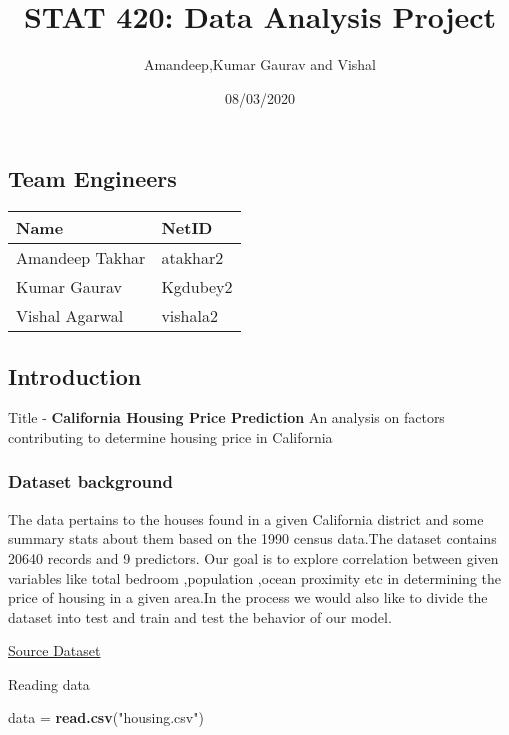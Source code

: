 \documentclass[
]{article}
\title{STAT 420: Data Analysis Project}
\author{Amandeep,Kumar Gaurav and Vishal}
\date{08/03/2020}
\newenvironment{Shaded}{\begin{snugshade}}{\end{snugshade}}
\newcommand{\KeywordTok}[1]{\textcolor[rgb]{0.13,0.29,0.53}{\textbf{#1}}}
\newcommand{\NormalTok}[1]{#1}
\newcommand{\StringTok}[1]{\textcolor[rgb]{0.31,0.60,0.02}{#1}}
\begin{document}
\maketitle

\hypertarget{team-engineers}{%
\subsection{Team Engineers}\label{team-engineers}}

\begin{longtable}[]{@{}ll@{}}
\toprule
Name & NetID\tabularnewline
\midrule
\endhead
Amandeep Takhar & atakhar2\tabularnewline
Kumar Gaurav & Kgdubey2\tabularnewline
Vishal Agarwal & vishala2\tabularnewline
\bottomrule
\end{longtable}

\hypertarget{introduction}{%
\subsection{Introduction}\label{introduction}}

Title - \textbf{California Housing Price Prediction} {An analysis on
factors contributing to determine housing price in California}

\hypertarget{dataset-background}{%
\subsubsection{Dataset background}\label{dataset-background}}

The data pertains to the houses found in a given California district and
some summary stats about them based on the 1990 census data.The dataset
contains 20640 records and 9 predictors. Our goal is to explore
correlation between given variables like total bedroom ,population
,ocean proximity etc in determining the price of housing in a given
area.In the process we would also like to divide the dataset into test
and train and test the behavior of our model.

\href{https://www.kaggle.com/camnugent/california-housing-prices}{Source
Dataset}

Reading data

\begin{Shaded}
\begin{Highlighting}[]
\NormalTok{data =}\StringTok{ }\KeywordTok{read.csv}\NormalTok{(}\StringTok{"housing.csv"}\NormalTok{)}
\end{Highlighting}
\end{Shaded}
\end{document}
